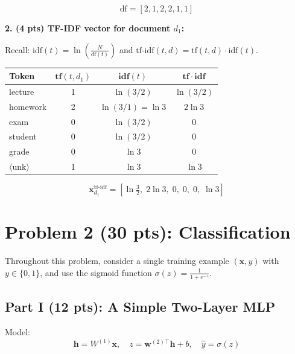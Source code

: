 \documentclass[11pt]{article}
\begin{document}
\[
\boxed{\text{df} = [2, 1, 2, 2, 1, 1]}
\]

\vspace{1em}
\textbf{2. (4 pts) TF-IDF vector for document $d_1$:}

Recall: $\text{idf}(t) = \ln\left(\frac{N}{\text{df}(t)}\right)$ and $\text{tf-idf}(t,d) = \text{tf}(t,d) \cdot \text{idf}(t)$.

\begin{center}
\begin{tabular}{l|c|c|c}
\toprule
\textbf{Token} & $\mathbf{tf}(t, d_1)$ & $\mathbf{idf}(t)$ & $\mathbf{tf \cdot idf}$ \\
\midrule
lecture & 1 & $\ln(3/2)$ & $\ln(3/2)$ \\
homework & 2 & $\ln(3/1) = \ln 3$ & $2\ln 3$ \\
exam & 0 & $\ln(3/2)$ & 0 \\
student & 0 & $\ln(3/2)$ & 0 \\
grade & 0 & $\ln 3$ & 0 \\
$\langle$unk$\rangle$ & 1 & $\ln 3$ & $\ln 3$ \\
\bottomrule
\end{tabular}
\end{center}

\[
\boxed{\mathbf{x}_{d_1}^{\text{tf-idf}} = \left[\ln\tfrac{3}{2},\; 2\ln 3,\; 0,\; 0,\; 0,\; \ln 3\right]}
\]

\newpage
\section*{Problem 2 (30 pts): Classification}

Throughout this problem, consider a single training example $(\mathbf{x}, y)$ with $y \in \{0, 1\}$, and use the sigmoid function $\sigma(z) = \frac{1}{1 + e^{-z}}$.

\subsection*{Part I (12 pts): A Simple Two-Layer MLP}

Model:
\[
\mathbf{h} = W^{(1)}\mathbf{x}, \quad z = \mathbf{w}^{(2)\top}\mathbf{h} + b, \quad \hat{y} = \sigma(z)
\]
\end{document}

